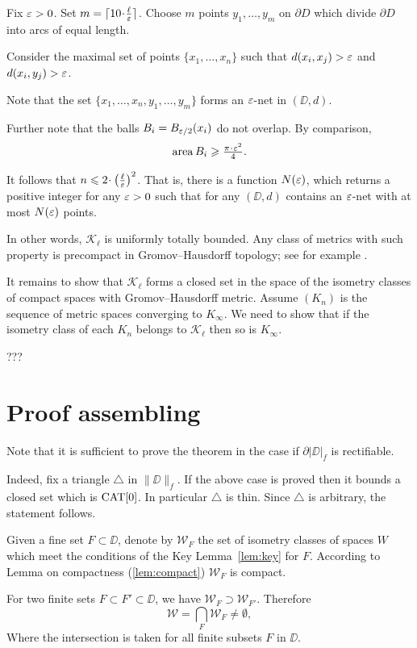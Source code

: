 \documentclass[a4paper,10pt]{amsart}
\begin{document}
Fix $\varepsilon>0$. 
Set $m=\lceil 10\cdot\tfrac\ell\eps\rceil$.
Choose $m$ points $y_1,\dots,y_m$ on $\partial D$
which divide $\partial D$ into arcs of equal length.

Consider the maximal set of points $\{x_1,\dots,x_n\}$ such that $d(x_i,x_j)>\varepsilon$ and $d(x_i,y_j)>\varepsilon$.

Note that the set $\{x_1,\dots,x_n,y_1,\dots,y_m\}$
forms an $\varepsilon$-net in $(\DD,d)$.

Further note that the balls $B_i=B_{\varepsilon/2}(x_i)$
do not overlap.
By comparison,
\[\area B_i\ge \tfrac{\pi\cdot\eps^2}{4}.\]

It follows that $n\le 2\cdot\left(\tfrac\ell\eps\right)^2$.
That is, there is a function $N(\varepsilon)$,
which returns a positive integer for any $\varepsilon>0$
such that for any 
$(\DD,d)$ contains an $\varepsilon$-net
with at most $N(\varepsilon)$ points.

In other words, $\mathcal{K}_\ell$ is uniformly totally bounded.
Any class of metrics with such property is precompact in Gromov--Hausdorff topology; 
see for example \cite[7.4.15]{BBI}.

It remains to show that  $\mathcal{K}_\ell$ forms a closed set in the space of the isometry classes of compact spaces with Gromov--Hausdorff metric.
Assume $(K_n)$ is the sequence of metric spaces
converging to $K_\infty$.
We need to show that if the isometry class of each $K_n$ belongs to  
$\mathcal{K}_\ell$ then so is $K_\infty$.

???\qeds


\section{Proof assembling}

Note that it is sufficient to prove the theorem 
in the case if $\partial |\DD|_f$ is rectifiable.

Indeed, fix a triangle $\triangle$ in $\|\DD\|_f$.
If the above case is proved 
then it bounds a closed set which is $\mathop{\rm CAT}\nolimits[0]$.
In particular $\triangle$ is thin.
Since $\triangle$ is arbitrary, the statement follows.

Given a fine set $F\subset \DD$,
denote by $\mathcal{W}_F$
the set of isometry classes of spaces $W$ which meet the conditions of the Key Lemma~\ref{lem:key}
for $F$.
According to Lemma on compactness (\ref{lem:compact}) $\mathcal{W}_F$ is compact.

For two finite sets $F\subset F'\subset \DD$,
we have $\mathcal{W}_F\supset \mathcal{W}_{F'}$.
Therefore 
\[\mathcal{W}
=
\bigcap_{F}\mathcal{W}_F\ne \emptyset,\]
Where the intersection is taken for all finite subsets $F$ in $\DD$.
\end{document}
